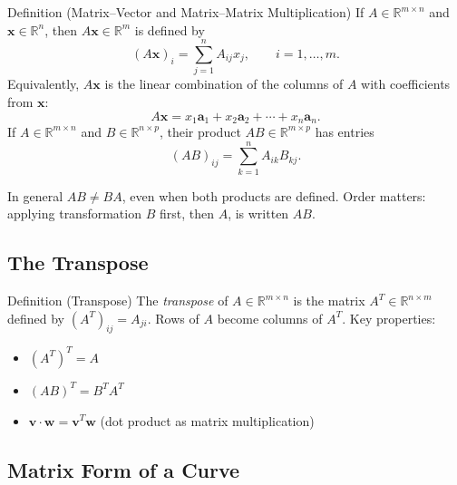 \begin{propositionbox}{Definition (Matrix--Vector and Matrix--Matrix Multiplication)}
If $A \in \mathbb{R}^{m \times n}$ and $\mathbf{x} \in \mathbb{R}^n$, then
$A\mathbf{x} \in \mathbb{R}^m$ is defined by
\[
  (A\mathbf{x})_i = \sum_{j=1}^n A_{ij} x_j, \qquad i = 1, \ldots, m.
\]
Equivalently, $A\mathbf{x}$ is the linear combination of the columns of $A$
with coefficients from $\mathbf{x}$:
\[
  A\mathbf{x} = x_1 \mathbf{a}_1 + x_2 \mathbf{a}_2 + \cdots + x_n \mathbf{a}_n.
\]
If $A \in \mathbb{R}^{m \times n}$ and $B \in \mathbb{R}^{n \times p}$, their product
$AB \in \mathbb{R}^{m \times p}$ has entries
\[
  (AB)_{ij} = \sum_{k=1}^n A_{ik} B_{kj}.
\]
\end{propositionbox}

\begin{remark*}
In general $AB \neq BA$, even when both products are defined.
Order matters: applying transformation $B$ first, then $A$, is written $AB$.
\end{remark*}

\subsection*{The Transpose}

\begin{propositionbox}{Definition (Transpose)}
The \emph{transpose} of $A \in \mathbb{R}^{m \times n}$ is the matrix
$A^T \in \mathbb{R}^{n \times m}$ defined by $(A^T)_{ij} = A_{ji}$.
Rows of $A$ become columns of $A^T$.
Key properties:
\begin{itemize}
  \item $(A^T)^T = A$
  \item $(AB)^T = B^T A^T$
  \item $\mathbf{v} \cdot \mathbf{w} = \mathbf{v}^T \mathbf{w}$ (dot product as matrix multiplication)
\end{itemize}
\end{propositionbox}

\subsection*{Matrix Form of a Curve}

